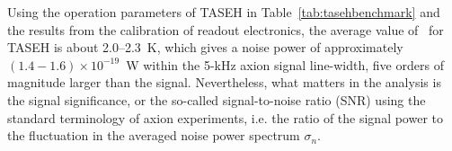 
Using the operation parameters of TASEH in Table~\ref{tab:tasehbenchmark} and 
the results from the calibration of readout electronics, 
the average value of \tsys\ for TASEH 
is about 2.0--2.3~K, which gives a noise power of approximately 
$\left(1.4-1.6\right)\times 10^{-19}$~W within the 5-kHz axion signal 
line-width, five 
orders of magnitude larger than the signal. Nevertheless, what matters in the 
analysis is the signal significance, or the so-called signal-to-noise ratio 
(SNR) using the standard terminology of axion experiments, i.e. the ratio of 
the signal power to the fluctuation in the averaged noise power spectrum 
$\sigma_n$. 

